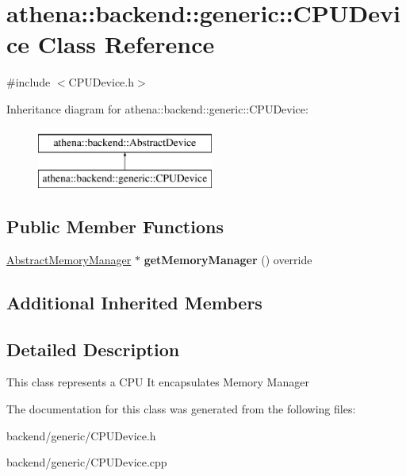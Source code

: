 \hypertarget{classathena_1_1backend_1_1generic_1_1_c_p_u_device}{}\section{athena\+:\+:backend\+:\+:generic\+:\+:C\+P\+U\+Device Class Reference}
\label{classathena_1_1backend_1_1generic_1_1_c_p_u_device}


{\ttfamily \#include $<$C\+P\+U\+Device.\+h$>$}

Inheritance diagram for athena\+:\+:backend\+:\+:generic\+:\+:C\+P\+U\+Device\+:\begin{figure}[H]
\begin{center}
\leavevmode
\includegraphics[height=2.000000cm]{classathena_1_1backend_1_1generic_1_1_c_p_u_device}
\end{center}
\end{figure}
\subsection*{Public Member Functions}
\begin{DoxyCompactItemize}
\item 
\mbox{\label{classathena_1_1backend_1_1generic_1_1_c_p_u_device_a813561ea04e66b4fc25c720242c70238}} 
\mbox{\hyperlink{classathena_1_1backend_1_1_abstract_memory_manager}{Abstract\+Memory\+Manager}} $\ast$ {\bfseries get\+Memory\+Manager} () override
\end{DoxyCompactItemize}
\subsection*{Additional Inherited Members}


\subsection{Detailed Description}
This class represents a C\+PU It encapsulates Memory Manager 

The documentation for this class was generated from the following files\+:\begin{DoxyCompactItemize}
\item 
backend/generic/C\+P\+U\+Device.\+h\item 
backend/generic/C\+P\+U\+Device.\+cpp\end{DoxyCompactItemize}
